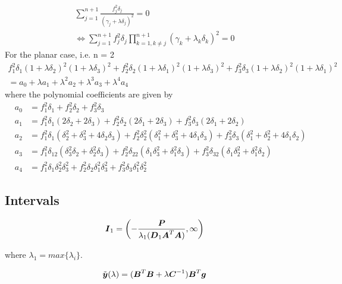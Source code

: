 \begin{eqnarray}
\sum^{n+1}_{j=1} \frac{f^2_j\delta_j}{\left(\gamma_j+\lambda\delta_j\right)^2} = 0 \\
\nonumber
\Leftrightarrow \sum^{n+1}_{j=1} f^2_j\delta_j \prod^{n+1}_{k=1,k\neq j}\left(\gamma_k + \lambda_k\delta_k\right)^2 = 0 
\end{eqnarray}
For the planar case, i.e. n = 2
\begin{equation}
\nonumber
\begin{aligned}
 f^2_1\delta_1(1 + \lambda\delta_2)^2(1 + \lambda\delta_3)^2 + f^2_2\delta_2(1 + \lambda\delta_1)^2(1 + \lambda\delta_3)^2 + f^2_3\delta_3(1 + \lambda\delta_2)^2(1 + \lambda\delta_1)^2 \\ 
 = a_0 + \lambda a_1 + \lambda^2 a_2 + \lambda^3 a_3 + \lambda^4 a_4
\end{aligned}
\end{equation}
where the polynomial coefficients are given by
\begin{eqnarray}
\nonumber
&a_0 &= f^2_1\delta_1 + f^2_2\delta_2 + f^2_3\delta_3 \\
\nonumber
&a_1 &= f^2_1\delta_1(2\delta_2 + 2\delta_3) + f^2_2\delta_2(2\delta_1 + 2\delta_3) + f^2_3\delta_3(2\delta_1 + 2\delta_2)
 \\
\nonumber
&a_2 &= f^2_1\delta_1(\delta^2_2 + \delta^2_3 + 4\delta_2\delta_3) + f^2_2\delta^2_2(\delta^2_1 + \delta^2_3 + 4\delta_1\delta_3) + f^2_3\delta_3(\delta^2_1 + \delta^2_2 + 4\delta_1\delta_2) \\
\nonumber
&a_3 &= f^2_1\delta_12(\delta^2_3\delta_2 + \delta^2_2\delta_3) + f^2_2\delta_22(\delta_1\delta^2_3 + \delta^2_1\delta_3) + f^2_3\delta_32(\delta_1\delta^2_2 + \delta^2_1\delta_2) \\
\nonumber
&a_4 &= f^2_1\delta_1\delta^2_2\delta^2_3 + f^2_2\delta_2\delta^2_1\delta^2_3 + f^2_3\delta_3\delta^2_1\delta^2_2
\end{eqnarray}

\subsection{Intervals}

\begin{equation}
\mbox{\boldmath$I$}_1 = \left(-\frac{\mbox{\boldmath$P$}}{\lambda_1(\mbox{\boldmath$D$}_1\mbox{\boldmath$A$}^T\mbox{\boldmath$A$})}, \infty\right)
\end{equation}

where $\lambda_1 = max\{\lambda_i\}$.

\begin{equation}
\tilde{\mbox{\boldmath$y$}}(\lambda) = (\mbox{\boldmath$B$}^T\mbox{\boldmath$B$} + \lambda\mbox{\boldmath$C$}^{-1})\mbox{\boldmath$B$}^T\mbox{\boldmath$g$}
\end{equation}


